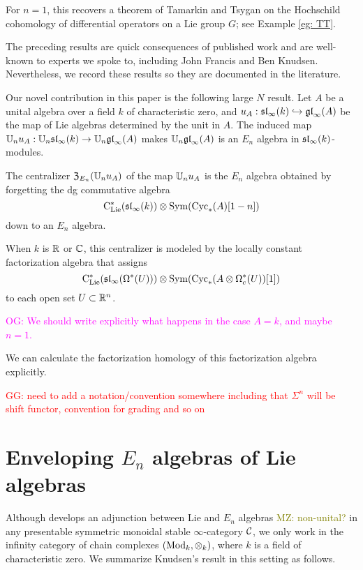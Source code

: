 \documentclass[11pt]{amsart}
\numberwithin{equation}{section}
\def\owen{\textcolor{magenta}{OG: }\textcolor{magenta}}
\def\mahmoud{\textcolor{olive}{MZ: }\textcolor{olive}}
\def\greg{\textcolor{red}{GG: }\textcolor{red}}
\begin{document}
For $n=1$, this recovers a theorem of Tamarkin and Tsygan \cite{TT} on the Hochschild cohomology of differential operators on a Lie group $G$; see Example \ref{eg: TT}. 

\begin{rmk}
The preceding results are quick consequences of published work and are well-known to experts we spoke to, including John Francis and Ben Knudsen. Nevertheless, we record these results so they are documented in the literature.
\end{rmk}

Our novel contribution in this paper is the following large $N$ result. Let $A$ be a unital algebra over a field $k$ of characteristic zero, and $u_A: \sl_\infty(k) \hookrightarrow \gl_\infty(A)$ be the map of Lie algebras determined by the unit in $A$. The induced map $\UU_nu_A: \UU_n\sl_\infty(k) \to \UU_n\gl_\infty(A)$ makes $\UU_n\gl_\infty(A)$ is an $E_n$ algebra in $\sl_\infty(k)$-modules.

\begin{thm}
\label{thm: large N}

The centralizer ${\frak Z}_{E_n}(\UU_nu_A)$ of the map $\UU_nu_A$ is the $E_n$ algebra obtained by forgetting the dg commutative algebra
\[
\clies(\sl_\infty(k)) \otimes \Sym(\Cyc_*(A)[1-n])
\]
down to an $E_n$ algebra.

When $k$ is $\RR$ or $\CC$, this centralizer is modeled by the locally constant factorization algebra that assigns
\[
\clies(\sl_\infty(\Omega^*(U)))\otimes \Sym(\Cyc_*(A \otimes \Omega^*_c(U))[1])
\]
to each open set $U \subset \RR^n$.
\end{thm}

\owen{We should write explicitly what happens in the case $A = k$, and maybe $n=1$.}

We can calculate the factorization homology of this factorization algebra explicitly.

\greg{need to add a notation/convention somewhere including that $\Sigma^n$ will be shift functor, convention for grading and so on}
\section{Enveloping $E_n$ algebras of Lie algebras}

Although \cite{Knudsen} develops an adjunction between Lie and $E_n$ algebras \mahmoud{non-unital?} in any presentable symmetric monoidal stable $\infty$-category $\cC$,
we only work in the infinity category of chain complexes $(\Mod_k, \otimes_k)$, where $k$ is a field of characteristic zero. We summarize Knudsen's result in this setting as follows.
\end{document}
